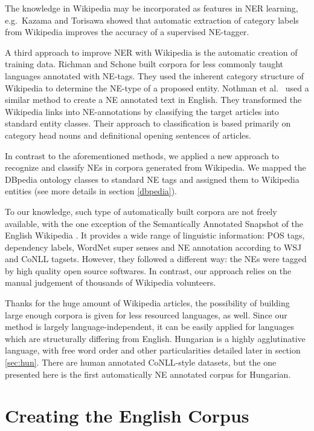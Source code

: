 \documentclass[11pt]{article}
\begin{document}
The knowledge in Wikipedia may be incorporated as features in NER learning, e.g.~Kazama and Torisawa  showed that automatic extraction of category labels from Wikipedia improves the accuracy of a supervised NE-tagger. 

A third approach to improve NER with Wikipedia is the automatic creation of training data. Richman and Schone  built corpora for less commonly taught languages annotated with NE-tags. They used the inherent category structure of Wikipedia to determine the NE-type of a proposed entity. Nothman et al.~ used a similar method to create a NE annotated text in English. They transformed the Wikipedia links into NE-annotations by classifying the target articles into standard entity classes. Their approach to classification is based primarily on category head nouns and definitional opening sentences of articles. 

In contrast to the aforementioned methods, we applied a new approach to recognize and classify NEs in corpora generated from Wikipedia. We mapped the DBpedia ontology classes to standard NE tags and assigned them to Wikipedia entities (see more details in section \ref{dbpedia}).

To our knowledge, such type of automatically built corpora are not freely available, with the one exception of the Semantically Annotated Snapshot of the English Wikipedia \cite{Zaragoza:07}. It provides a wide range of linguistic information: POS tags, dependency labels, WordNet super senses and NE annotation according to WSJ and CoNLL tagsets. However, they followed a different way: the NEs were tagged by high quality open source softwares. In contrast, our approach relies on the manual judgement of thousands of Wikipedia volunteers.

Thanks for the huge amount of Wikipedia articles, the possibility of building large enough 
corpora is given for less resourced languages, as well. Since our method is largely language-independent, it can be easily applied for languages which are structurally differing from English. Hungarian is a highly agglutinative language, with free word order and other particularities detailed later in section \ref{sec:hun}. There are human annotated CoNLL-style datasets, but the one presented here is the first automatically NE annotated corpus for Hungarian.

\section{Creating the English Corpus} 
\label{sec:create}
\end{document}
